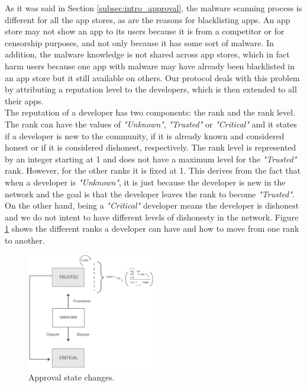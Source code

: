 As it was said in Section \ref{subsec:intro_approval}, the malware scanning process is different for all the app stores, as are the reasons for blacklisting apps. An app store may not show an app to its users because it is from a competitor or for censorship purposes, and not only because it has some sort of malware. In addition, the malware knowledge is not shared across app stores, which in fact harm users because one app with malware may have already been blacklisted in an app store but it still available on others. Our protocol deals with this problem by attributing a reputation level to the developers, which is then extended to all their apps. \\

The reputation of a developer has two components: the rank and the rank level. The rank can have the values of \textit{"Unknown"}, \textit{"Trusted"} or \textit{"Critical"} and it states if a developer is new to the community, if it is already known and considered honest or if it is considered dishonest, respectively. The rank level is represented by an integer starting at 1 and does not have a maximum level for the \textit{"Trusted"} rank. However, for the other ranks it is fixed at 1. This derives from the fact that when a developer is \textit{"Unknown"}, it is just because the developer is new in the network and the goal is that the developer leaves the rank to become \textit{"Trusted"}. On the other hand, being a \textit{"Critical"} developer means the developer is dishonest and we do not intent to have different levels of dishonesty in the network. Figure \ref{fig:approval_state_diagram} shows the different ranks a developer can have and how to move from one rank to another. \\

\begin{figure}[!ht]
\centering
\includegraphics[width=0.5\textwidth]{diagrams/approval_state_diagram.eps}
\caption{Approval state changes.}
\label{fig:approval_state_diagram}
\end{figure}

